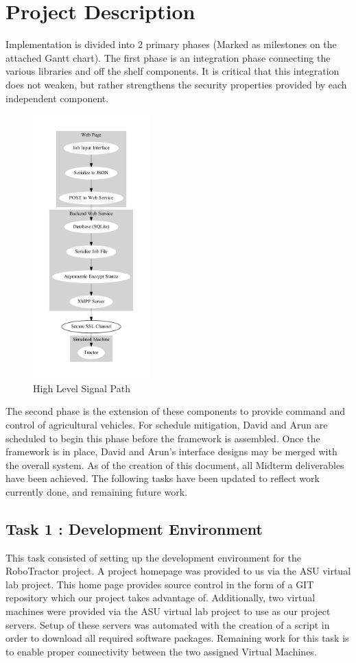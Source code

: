 \documentclass[conference,12pt]{IEEEtran}
\begin{document}
\section{Project Description}
\label{sec:proj_desc}
Implementation is divided into 2 primary phases (Marked as milestones on the
attached Gantt chart).  The first phase is an integration phase connecting
the various libraries and off the shelf components. It is critical that this
integration does not weaken, but rather strengthens the security properties
provided by each independent component. 

\begin{figure}
\centering
\includegraphics[width=0.4\textwidth]{signalpath.pdf}
\caption{High Level Signal Path}
\label{fig:signalpath}
\end{figure}


The second phase is the extension of these components to provide command and
control of agricultural vehicles. For schedule mitigation, David and Arun are
scheduled to begin this phase before the framework is assembled. Once the
framework is in place, David and Arun's interface designs may be merged with the
overall system. As of the creation of this document, all Midterm deliverables have been achieved.
The following tasks have been updated to reflect work currently done, and remaining future work.

\subsection{Task 1 : Development Environment}
This task consisted of setting up the development environment for the RoboTractor project. 
A project homepage was provided to us via the ASU virtual lab project. This home page provides
source control in the form of a GIT repository which our project takes advantage of. Additionally, two
virtual machines were provided via the ASU virtual lab project to use as our project servers. Setup of
these servers was automated with the creation of a script in order to download all required software packages.
Remaining work for this task is to enable proper connectivity between the two
assigned Virtual Machines. 
\end{document}
